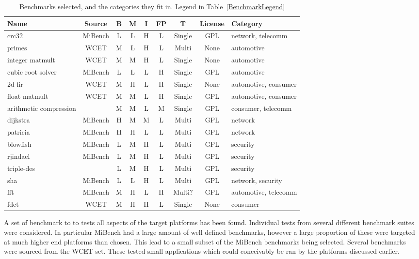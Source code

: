 \documentclass[twocolumn]{article}
\begin{document}
\begin{table*}
\centering
	\begin{tabular}{l c c c c c c c l}
	Name				 	& Source 	& B & M & I & FP& T 		& License & Category \\
	\hline
	crc32					& MiBench 	& L & L & H & L & Single 	& GPL	& network, telecomm	\\
	primes					& WCET 		& M & L & H & L & Multi 	& None	& automotive	\\
	integer matmult			& WCET	 	& M & M & H & L & Single 	& None	& automotive	\\
	cubic root solver		& MiBench 	& L & L & L & H & Single 	& GPL	& automotive	\\
	2d fir					& WCET 		& M & H & L & H & Single 	& None	& automotive, consumer	\\
	float matmult			& WCET 		& M & M & L & H & Single 	& GPL	& automotive, consumer	\\
	arithmetic compression	&			& M & M & L & M & Single 	& GPL	& consumer, telecomm	\\
	dijkstra				& MiBench 	& H & M & M & L & Multi 	& GPL	& network	\\
	patricia				& MiBench 	& H & H & L & L & Multi 	& GPL	& network	\\
	blowfish				& MiBench 	& L & M & H & L & Multi 	& GPL	& security	\\
	rjindael				& MiBench 	& L & M & H & L & Multi 	& GPL	& security	\\
	triple-des				&		 	& L & M & H & L & Multi 	& GPL	& security	\\
	sha						& MiBench 	& L & L & H & L & Multi 	& GPL	& network, security	\\
	fft						& MiBench 	& M & H & L & H & Multi?	&  GPL	& automotive, telecomm	\\
	fdct					& WCET 		& M & H & H & L & Single 	& None	& consumer	\\
	\end{tabular}
\caption{Benchmarks selected, and the categories they fit in. Legend in Table~\ref{BenchmarkLegend}}
\end{table*}


A set of benchmark to to tests all aspects of the target platforms has been found. Individual tests from several different benchmark suites were considered. In particular MiBench had a large amount of well defined benchmarks, however a large proportion of these were targeted at much higher end platforms than chosen. This lead to a small subset of the MiBench benchmarks being selected. Several benchmarks were sourced from the WCET set. These tested small applications which could conceivably be ran by the platforms discussed earlier.
\end{document}
